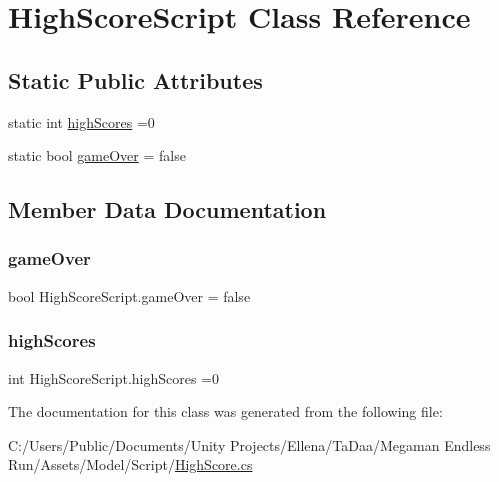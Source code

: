 \hypertarget{class_high_score_script}{}\section{High\+Score\+Script Class Reference}
\label{class_high_score_script}
\subsection*{Static Public Attributes}
\begin{DoxyCompactItemize}
\item 
static int \hyperlink{class_high_score_script_a481a30c3e39d2e330f78346ac0424113}{high\+Scores} =0
\item 
static bool \hyperlink{class_high_score_script_a3f1b9e311b60157195b01e31b1e6b6d1}{game\+Over} = false
\end{DoxyCompactItemize}


\subsection{Member Data Documentation}
\hypertarget{class_high_score_script_a3f1b9e311b60157195b01e31b1e6b6d1}{}\label{class_high_score_script_a3f1b9e311b60157195b01e31b1e6b6d1} 
\subsubsection{\texorpdfstring{game\+Over}{gameOver}}
{\footnotesize\ttfamily bool High\+Score\+Script.\+game\+Over = false\hspace{0.3cm}{\ttfamily [static]}}

\hypertarget{class_high_score_script_a481a30c3e39d2e330f78346ac0424113}{}\label{class_high_score_script_a481a30c3e39d2e330f78346ac0424113} 
\subsubsection{\texorpdfstring{high\+Scores}{highScores}}
{\footnotesize\ttfamily int High\+Score\+Script.\+high\+Scores =0\hspace{0.3cm}{\ttfamily [static]}}



The documentation for this class was generated from the following file\+:\begin{DoxyCompactItemize}
\item 
C\+:/\+Users/\+Public/\+Documents/\+Unity Projects/\+Ellena/\+Ta\+Daa/\+Megaman Endless Run/\+Assets/\+Model/\+Script/\hyperlink{_high_score_8cs}{High\+Score.\+cs}\end{DoxyCompactItemize}
